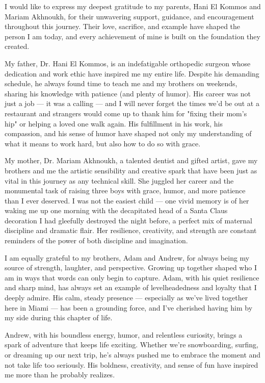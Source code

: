 \begin{dissacknowledgments}

I would like to express my deepest gratitude to my parents, Hani El Kommos and Mariam Akhnoukh, for their unwavering support, guidance, and encouragement throughout this journey. Their love, sacrifice, and example have shaped the person I am today, and every achievement of mine is built on the foundation they created.

My father, Dr. Hani El Kommos, is an indefatigable orthopedic surgeon whose dedication and work ethic have inspired me my entire life. Despite his demanding schedule, he always found time to teach me and my brothers on weekends, sharing his knowledge with patience (and plenty of humor). His career was not just a job --- it was a calling --- and I will never forget the times we'd be out at a restaurant and strangers would come up to thank him for "fixing their mom's hip" or helping a loved one walk again. His fulfillment in his work, his compassion, and his sense of humor have shaped not only my understanding of what it means to work hard, but also how to do so with grace.
    
My mother, Dr. Mariam Akhnoukh, a talented dentist and gifted artist, gave my brothers and me the artistic sensibility and creative spark that have been just as vital in this journey as any technical skill. She juggled her career and the monumental task of raising three boys with grace, humor, and more patience than I ever deserved. I was not the easiest child --- one vivid memory is of her waking me up one morning with the decapitated head of a Santa Claus decoration I had gleefully destroyed the night before, a perfect mix of maternal discipline and dramatic flair. Her resilience, creativity, and strength are constant reminders of the power of both discipline and imagination.

I am equally grateful to my brothers, Adam and Andrew, for always being my source of strength, laughter, and perspective. Growing up together shaped who I am in ways that words can only begin to capture. Adam, with his quiet resilience and sharp mind, has always set an example of levelheadedness and loyalty that I deeply admire. His calm, steady presence --- especially as we've lived together here in Miami --- has been a grounding force, and I've cherished having him by my side during this chapter of life.

Andrew, with his boundless energy, humor, and relentless curiosity, brings a spark of adventure that keeps life exciting. Whether we're snowboarding, surfing, or dreaming up our next trip, he's always pushed me to embrace the moment and not take life too seriously. His boldness, creativity, and sense of fun have inspired me more than he probably realizes.


\end{dissacknowledgments}

